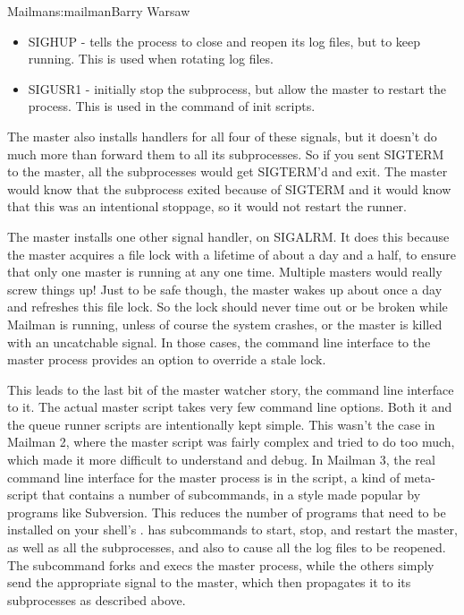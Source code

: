 \begin{aosachapter}{Mailman}{s:mailman}{Barry Warsaw}
\begin{itemize}
\item SIGHUP - tells the process to close and reopen its log files, but to keep
running.  This is used when rotating log files.

\item SIGUSR1 - initially stop the subprocess, but allow the master to restart
the process.  This is used in the  command of init scripts.

\end{itemize}

The master also installs handlers for all four of these signals, but it
doesn't do much more than forward them to all its subprocesses.  So if you
sent SIGTERM to the master, all the subprocesses would get SIGTERM'd and
exit.  The master would know that the subprocess exited because of SIGTERM and
it would know that this was an intentional stoppage, so it would not restart
the runner.

The master installs one other signal handler, on SIGALRM.  It does this
because the master acquires a file lock with a lifetime of about a day and a
half, to ensure that only one master is running at any one time.  Multiple
masters would really screw things up!  Just to be safe though, the master
wakes up about once a day and refreshes this file lock.  So the lock should
never time out or be broken while Mailman is running, unless of course the
system crashes, or the master is killed with an uncatchable signal.  In those
cases, the command line interface to the master process provides an option to
override a stale lock.

This leads to the last bit of the master watcher story, the command line
interface to it.  The actual master script takes very few command line
options.  Both it and the queue runner scripts are intentionally kept simple.
This wasn't the case in Mailman 2, where the master script was fairly complex
and tried to do too much, which made it more difficult to understand and
debug.  In Mailman 3, the real command line interface for the master process
is in the  script, a kind of meta-script that contains a number
of subcommands, in a style made popular by programs like Subversion.  This
reduces the number of programs that need to be installed on your shell's
.   has subcommands to start, stop, and restart the
master, as well as all the subprocesses, and also to cause all the log files
to be reopened.  The  subcommand forks and execs the master process,
while the others simply send the appropriate signal to the master, which then
propagates it to its subprocesses as described above.


\end{aosachapter}
